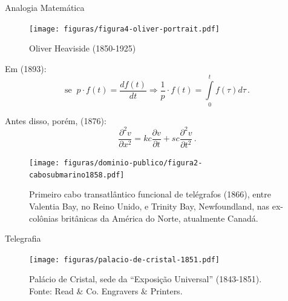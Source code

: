 \documentclass[aspectratio=169]{beamer}
\begin{document}
\begin{frame}{Analogia Matemática}
\begin{minipage}{0.5\textwidth}
	\begin{figure}[hbtp]
		\centering
		\texttt{[image: figuras/figura4-oliver-portrait.pdf]}
		\caption{Oliver Heaviside (1850-1925)} 
	\end{figure}
\end{minipage}
\begin{minipage}{0.47\textwidth}
Em (1893): $$\mbox{se}\; \; p \cdot f(t) = \frac{df(t)}{dt} \Rightarrow \frac{1}{p} \cdot f(t) = \int \limits_{0}^{t} f(\tau)d \tau \,.$$

		Antes disso, porém, (1876): $$\frac{\partial^{2} v}{\partial x^{2}} = kc\frac{\partial v}{\partial t} + sc\frac{\partial^{2} v}{\partial t^{2}}\,.$$
\end{minipage}
\end{frame}

\begin{frame}
\begin{figure}
	\centering
	\texttt{[image: figuras/dominio-publico/figura2-cabosubmarino1858.pdf]}
	\caption{Primeiro cabo transatlântico funcional de telégrafos (1866), entre Valentia Bay, no Reino Unido, e Trinity Bay, Newfoundland, nas ex-colônias britânicas da América do Norte, atualmente Canadá.} 
	\label{fig:10} 
\end{figure}
\end{frame}

\begin{frame}{Telegrafia}
\begin{figure}[!hbt]
	\centering
	\texttt{[image: figuras/palacio-de-cristal-1851.pdf]}
	\caption{Palácio de Cristal, sede da ``Exposição Universal'' (1843-1851). Fonte: Read $\&$ Co. Engravers $\&$ Printers.} 
	\label{fig:501} 
\end{figure}
\end{frame}
\end{document}
